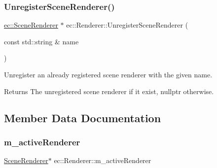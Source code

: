 \mbox{\label{classec_1_1_renderer_ac5063a2c741004706dfe6dc143f8168f}} 
\subsubsection{\texorpdfstring{Unregister\+Scene\+Renderer()}{UnregisterSceneRenderer()}}
{\footnotesize\ttfamily \mbox{\hyperlink{classec_1_1_scene_renderer}{ec\+::\+Scene\+Renderer}} $\ast$ ec\+::\+Renderer\+::\+Unregister\+Scene\+Renderer (\begin{DoxyParamCaption}\item[{const std\+::string \&}]{name }\end{DoxyParamCaption})}

Unregister an already registered scene renderer with the given name. \begin{DoxyReturn}{Returns}
The unregistered scene renderer if it exist, nullptr otherwise. 
\end{DoxyReturn}


\subsection{Member Data Documentation}
\mbox{\label{classec_1_1_renderer_a00afed952025d62a654a5f961a55b342}} 
\subsubsection{\texorpdfstring{m\+\_\+active\+Renderer}{m\_activeRenderer}}
{\footnotesize\ttfamily \mbox{\hyperlink{classec_1_1_scene_renderer}{Scene\+Renderer}}$\ast$ ec\+::\+Renderer\+::m\+\_\+active\+Renderer\hspace{0.3cm}{\ttfamily [protected]}}

\mbox{\label{classec_1_1_renderer_a818d84064fde8088d28358f7ea04f898}} 
